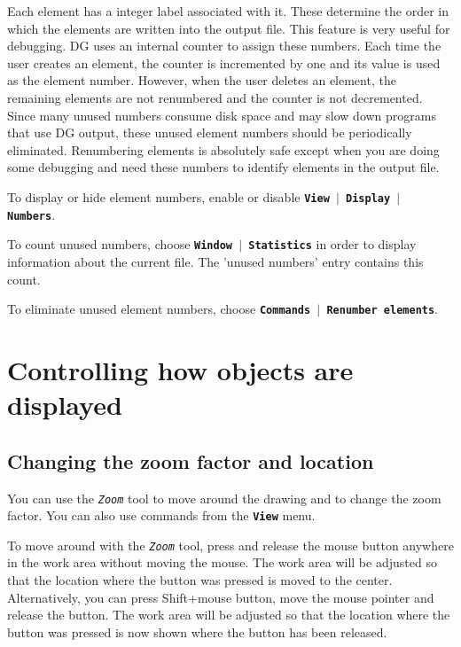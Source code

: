 \documentclass[12pt]{report}
\begin{document}
Each element has a integer label associated with it. These
determine the order in which the elements are written 
into the output file. This
feature is very useful for debugging. DG uses an internal counter to
assign these numbers. Each time the user creates an element, the
counter is incremented by one and its value is used as the element
number. However, when the user deletes an element, the remaining
elements are
not renumbered and the counter is not decremented. Since many unused
numbers consume disk space and may slow down programs that use DG
output, these unused element numbers should be periodically eliminated.
Renumbering elements is
absolutely safe except when you are doing some debugging and need these
numbers to identify elements in the output file.

To display or hide element numbers, enable or disable
\textbf{\texttt{View  \begin{math}\vert{}\end{math}  Display  \begin{math}\vert{}\end{math}  Numbers}}.

To count unused numbers, choose
\textbf{\texttt{Window  \begin{math}\vert{}\end{math}  Statistics}} in order
to display information about the current file. The 'unused numbers'
entry contains this count.

To eliminate unused element numbers, choose
\textbf{\texttt{Commands  \begin{math}\vert{}\end{math}  Renumber
elements}}.

\chapter{Controlling how objects are displayed}

\section{Changing the zoom factor and location}

You can use the \textit{\texttt{Zoom}} tool to move around the drawing
and to change the zoom factor. You can also use commands from the
\textbf{\texttt{View}} menu.

To move around with the \textit{\texttt{Zoom}} tool, press and release
the mouse button anywhere in the work area without moving the mouse.
The work area will be adjusted so that the location where the button
was pressed is moved to the center. Alternatively, you can press
Shift+mouse button, move the mouse pointer and release the button. The
work area will be adjusted so that the location where the button was
pressed is now shown where the button has been released.
\end{document}
